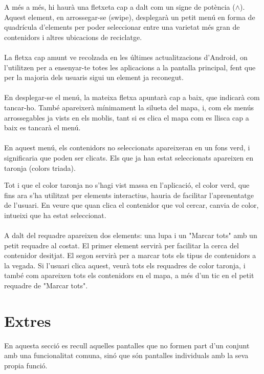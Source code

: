 \documentclass{article}
\begin{document}
A més a més, hi haurà una fletxeta cap a dalt com un signe de potència
($\wedge$). Aquest element, en arrossegar-se (swipe), desplegarà un petit
menú en forma de quadrícula d'elements per poder seleccionar entre una
varietat més gran de contenidors i altres ubicacions de reciclatge.
\\\\
La fletxa cap amunt ve recolzada en les últimes
actualitzacions d'Android, on l'utilitzen per a ensenyar-te
totes les aplicacions a la pantalla principal, fent que per
la majoria dels usuaris sigui un element ja reconegut.
\\\\
En desplegar-se el menú, la mateixa fletxa apuntarà cap a
baix, que indicarà com tancar-ho. També apareixerà mínimament
la silueta del mapa, i, com els menús arrossegables ja vists en els
moblis, tant si es clica el mapa com es llisca cap a baix es
tancarà el menú.
\\\\
En aquest menú, els contenidors no seleccionats apareixeran en un fons verd,
i significaria que poden ser clicats. Els que ja han estat seleccionats
apareixen en taronja (colors triada).

Tot i que el color taronja no s'hagi vist massa en l'aplicació,
el color verd, que fins ara s'ha utilitzat per elements interactius,
hauria de facilitar l'aprenentatge de l'usuari. En veure que
quan clica el contenidor que vol cercar, canvia de color, intueixi que
ha estat seleccionat. \\\\
%
A dalt del requadre apareixen dos elements: una lupa i un "Marcar tots" amb
un petit requadre al costat. El primer element servirà per
facilitar la cerca del contenidor desitjat. El segon servirà per a marcar
tots els tipus de contenidors a la vegada. Si l'usuari clica aquest, veurà
tots els requadres de color taronja, i també com apareixen tots els contenidors
en el mapa, a més d'un tic en el petit requadre de "Marcar tots".

\section{Extres}
En aquesta secció es recull aquelles pantalles que no formen part d'un conjunt amb una funcionalitat comuna, sinó que són pantalles individuals amb la seva propia funció.
\end{document}
